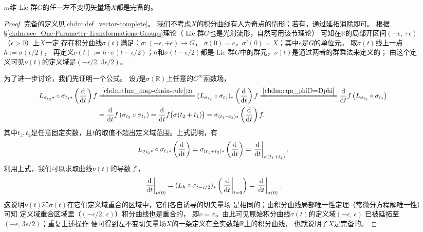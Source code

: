\begin{theorem}\label{chlg:thm_comlv}
    $m$维 Lie 群$G$的任一左不变切矢量场$X$都是完备的。
\end{theorem}
\begin{proof}
    完备的定义见\ref{chdm:def_vector-complete}。
    我们不考虑$X$的积分曲线有人为奇点的情形；若有，通过延拓消除即可。
    根据\S \ref{chdm:sec_One-Parameter-Transformations-Groups}理论（ Lie 群$G$也是光滑流形，自然可用该节理论）
    可知在$\mathbb{R}$的局部开区间$(-\epsilon,+\epsilon)$（$\epsilon>0$）上$X$一定
    存在积分曲线$\sigma(t)$满足：$\sigma:(-\epsilon,+\epsilon) \to G$，
    $\sigma(0)=e$，$\sigma'(0)=X$；其中$e$是$G$的单位元。
    取$\sigma(t)$线上一点$h := \sigma(\epsilon/2)$，
    再定义$\nu(t) := h\cdot \sigma(t-\epsilon/2)$；$h$和$\sigma(t-\epsilon/2)$都是
     Lie 群$G$中的群元，$\nu(t)$是通过两者的群乘法来定义的；
    由这个定义可见$\nu(t)$的定义域是$(-\epsilon/2,\, 3\epsilon/2) $。

    为了进一步讨论，我们先证明一个公式。
    设$f$是$\sigma(\mathbb{R})$上任意的$C^\infty$函数场，
    \begin{align*}
        L_{\sigma_{t_2}*}\circ \sigma_{t_1*}\left(\frac{\d }{\d t}\right)f
        &\xlongequal{\ref{chdm:thm_map-chain-rule}(2)}
        (L_{\sigma_{t_2}}\circ \sigma_{t_1})_{*}\left(\frac{\d }{\d t}\right)f
        \xlongequal{\ref{chdm:eqn_phiD=Dphi}}
        \frac{\d }{\d t}f\left(L_{\sigma_{t_2}}\circ \sigma_{t_1}\right) \\
        &=\frac{\d }{\d t}f\left(\sigma_{t_2}\circ \sigma_{t_1}\right)
        =\frac{\d }{\d t}f\bigl(\sigma({t_2+t_1})\bigr)
        =\sigma_{(t_1+t_2)*}\left(\frac{\d }{\d t}\right)f.
    \end{align*}
    其中$t_1,t_2$是任意固定实数，且$t$的取值不超出定义域范围。上式说明，有
    \begin{equation}\label{chlg:eqn_lst}
        L_{\sigma_{t_2}*}\circ\sigma_{t_1*}\left(\frac{\dd }{\dd t}\right)
        =\sigma_{(t_1+t_2)*}\left(\frac{\dd }{\dd t}\right)
        =\left. \frac{\dd }{\dd t}\right|_{\sigma(t_1+t_2)}.
    \end{equation}
    利用上式，我们可以求取曲线$\nu(t)$的导数了，
    \begin{equation}
        \left. \frac{\dd }{\dd t}\right|_{\nu(0)} =
        (L_{h}\circ \sigma_{t-\epsilon/2})_{*}
        \left(\left. \frac{\dd }{\dd t}\right|_{t=0}\right)
        =\left. \frac{\dd }{\dd t}\right|_{\sigma(0)} .
    \end{equation}
    这说明$\nu(t)$和$\sigma(t)$在它们定义域重合的区域中，它们各自诱导的切矢量场
    是相同的；由积分曲线局部唯一性定理（常微分方程解唯一性）可知
    定义域重合区域里（$(-\epsilon/2,\, \epsilon)$）积分曲线也是重合的，
    即$\nu = \sigma$。由此可见原始积分曲线$\sigma(t)$的定义域$(-\epsilon,\, \epsilon) $
    已被延拓至$(-\epsilon,\, 3\epsilon/2) $；重复上述操作
    便可得到左不变切矢量场$X$的一条定义在全实数轴$\mathbb{R}$上的积分曲线，
    也就说明了$X$是完备的。
\end{proof}

